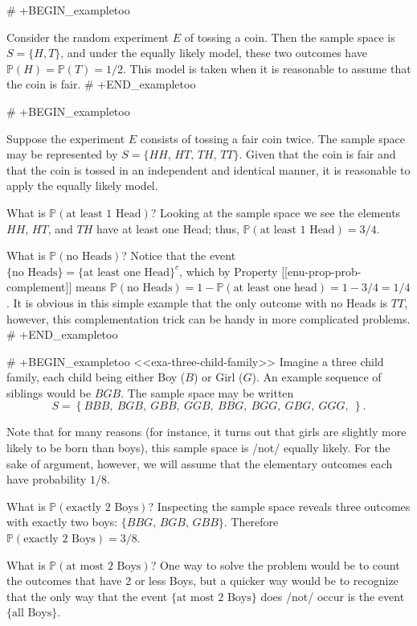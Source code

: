 # +BEGIN_exampletoo

Consider the random experiment \(E\) of tossing a coin. Then the
sample space is \(S=\{H,T\}\), and under the equally likely model,
these two outcomes have \(\mathbb{P}(H)=\mathbb{P}(T)=1/2\). This
model is taken when it is reasonable to assume that the coin is fair.
# +END_exampletoo


# +BEGIN_exampletoo

Suppose the experiment \(E\) consists of tossing a fair coin
twice. The sample space may be represented by \(S=\{HH,\, HT,\, TH,\,
TT\}\). Given that the coin is fair and that the coin is tossed in an
independent and identical manner, it is reasonable to apply the
equally likely model.

What is \(\mathbb{P}(\mbox{at least 1 Head})\)? Looking at the sample
space we see the elements \(HH\), \(HT\), and \(TH\) have at least one
Head; thus, \(\mathbb{P}(\mbox{at least 1 Head})=3/4\).

What is \(\mathbb{P}(\mbox{no Heads})\)? Notice that the event \(\{
\mbox{no Heads} \} = \{ \mbox{at least one Head} \} ^{c}\), which by
Property [[enu-prop-prob-complement]] means \(\mathbb{P}(\mbox{no
Heads})=1-\mathbb{P}(\mbox{at least one head})=1-3/4=1/4\). It is
obvious in this simple example that the only outcome with no Heads is
\(TT\), however, this complementation trick can be handy in more
complicated problems.
# +END_exampletoo


# +BEGIN_exampletoo
<<exa-three-child-family>> Imagine a three child family, each child
being either Boy (\(B\)) or Girl (\(G\)). An example sequence of
siblings would be \(BGB\). The sample space may be written \[ S =
\left\{ BBB,\ BGB,\ GBB,\ GGB,\ BBG,\ BGG,\ GBG,\ GGG,\ \right\}.\]

Note that for many reasons (for instance, it turns out that girls are
slightly more likely to be born than boys), this sample space is /not/
equally likely. For the sake of argument, however, we will assume that
the elementary outcomes each have probability \(1/8\).

What is \(\mathbb{P}(\mbox{exactly 2 Boys})\)? Inspecting the sample
space reveals three outcomes with exactly two boys: \( \{ BBG,\,
BGB,\, GBB \} \).  Therefore \(\mathbb{P}(\mbox{exactly 2 Boys}) =
3/8\).

What is \(\mathbb{P}(\mbox{at most 2 Boys})\)? One way to solve the
problem would be to count the outcomes that have 2 or less Boys, but a
quicker way would be to recognize that the only way that the event
\(\{ \mbox{at most 2 Boys} \}\) does /not/ occur is the event \(\{
\mbox{all Boys} \}\).


